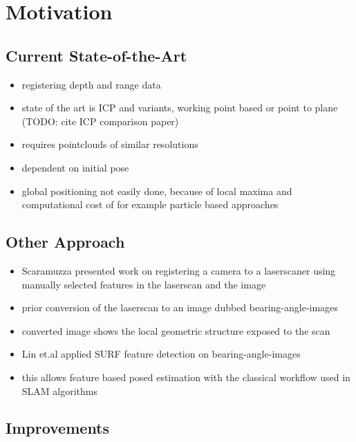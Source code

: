 \section{Motivation}

\subsection{Current State-of-the-Art}
\begin{itemize}
    \item registering depth and range data
    \item state of the art is ICP and variants, working point based or point to plane (TODO: cite ICP comparison paper)
    \item requires pointclouds of similar resolutions
    \item dependent on initial pose
    \item global positioning not easily done, because of local maxima and computational cost of for example particle based approaches
\end{itemize}

\subsection{Other Approach}

\begin{itemize}
    \item Scaramuzza\cite{Scaramuzza2007} presented work on registering a camera to a laserscaner using manually selected features in the laserscan and the image
    \item prior conversion of the laserscan to an image dubbed \Glspl{bearing-angle-image}
    \item converted image shows the local geometric structure exposed to the scan

    \item Lin et.al \cite{Lin2017} applied SURF feature detection on \Glspl{bearing-angle-image}
    \item this allows feature based posed estimation with the classical workflow used in SLAM algorithms
\end{itemize}

\subsection{Improvements}

